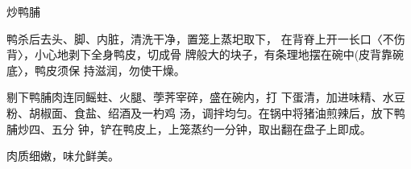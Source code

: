 \begin{recipe}{炒鸭脯}

\ingredients


\cooking

鸭杀后去头、脚、内脏，清洗干净，置笼上蒸圯取下， 在背脊上开一长口〈不伤背〉，小心地剥下全身鸭皮，切成骨 牌般大的块子，有条理地摆在碗中(皮背靠碗底〉，鸭皮须保 持滋润，勿使干燥。

剔下鸭脯肉连同鳐蛀、火腿、荸荠宰碎，盛在碗内，打 下蛋清，加进味精、水豆粉、胡椒面、食盐、绍酒及一杓鸡 汤，调拌均匀。在锅中将猪油煎辣后，放下鸭脯炒四、五分 钟，铲在鸭皮上，上笼蒸约一分钟，取出翻在盘子上即成。

\notes

肉质细嫩，味允鲜美。

\end{recipe}

